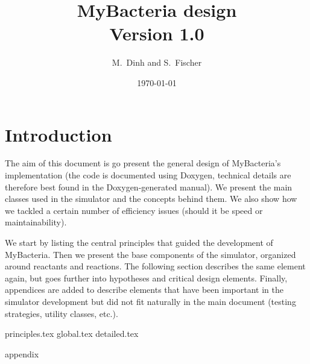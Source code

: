 \documentclass[12pt]{scrartcl}
\theoremstyle{definition}
\theoremstyle{remark}
\numberwithin{equation}{section}
\begin{document}
\title{MyBacteria design \\ Version 1.0}%
\author{M.~Dinh and S.~Fischer}%
\date{\today}%
\maketitle

\newpage

\tableofcontents

\newpage

\section{Introduction}

The aim of this document is go present the general design of MyBacteria's implementation
(the code is documented using Doxygen, technical details are therefore best found in the Doxygen-generated manual).
We present the main classes used in the simulator and the concepts behind them.
We also show how we tackled a certain number of efficiency issues (should it be speed or maintainability).

We start by listing the central principles that guided the development of MyBacteria.
Then we present the base components of the simulator, organized around reactants and reactions.
The following section describes the same element again, but goes further into hypotheses and critical design elements.
Finally, appendices are added to describe elements that have been important
in the simulator development but did not fit naturally in the main document
(testing strategies, utility classes, etc.).

{principles.tex}
{global.tex}
{detailed.tex}
\clearpage

\appendix
{appendix}
\clearpage



\end{document}
